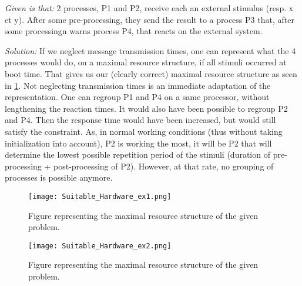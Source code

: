 \documentclass[../main.tex]{subfiles}
\begin{document}
\begin{exmp}
\emph{Given is that:} 2 processes, P1 and P2, receive each an external stimulus (resp. x et y). After some pre-processing, they send the result to a process P3 that, after some processingn warns process P4, that reacts on the external system. 

\emph{Solution:} If we neglect message transmission times, one can represent what the 4 processes would do, on a maximal resource structure, if all stimuli occurred at boot time.
That gives us our (clearly correct) maximal resource structure as seen in \ref{f:sh_ex1}.
Not neglecting transmission times is an immediate adaptation of the representation. One can regroup P1 and P4 on a same processor, without lengthening the reaction times. It would also have been possible to regroup P2 and P4. Then the response time would have been increased, but would still satisfy the constraint.
As, in normal working conditions (thus without taking initialization into account), P2 is working the most, it will be P2 that will determine the lowest possible repetition period of the stimuli (duration of pre-processing + post-processing of P2). However, at that rate, no grouping of processes is possible anymore.

\begin{figure}[H]
	\texttt{[image: Suitable\_Hardware\_ex1.png]}
	\caption{Figure representing the maximal resource structure of the given problem.}
	\label{f:sh_ex1}
\end{figure}

\begin{figure}[H]
	\texttt{[image: Suitable\_Hardware\_ex2.png]}
	\caption{Figure representing the maximal resource structure of the given problem.}
	\label{f:sh_ex2}
\end{figure}
\end{exmp}
\end{document}
